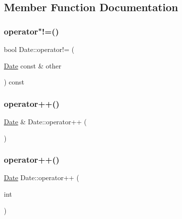 \subsection{Member Function Documentation}
\mbox{\label{classDate_a8b7030515e10d7d79f187165463a3315}} 
\subsubsection{\texorpdfstring{operator"!=()}{operator!=()}}
{\footnotesize\ttfamily bool Date\+::operator!= (\begin{DoxyParamCaption}\item[{\hyperlink{classDate}{Date} const \&}]{other }\end{DoxyParamCaption}) const}

\mbox{\label{classDate_a3993e645e3408e07d12b70e58f36630c}} 
\subsubsection{\texorpdfstring{operator++()}{operator++()}\hspace{0.1cm}{\footnotesize\ttfamily [1/2]}}
{\footnotesize\ttfamily \hyperlink{classDate}{Date} \& Date\+::operator++ (\begin{DoxyParamCaption}{ }\end{DoxyParamCaption})}

\mbox{\label{classDate_a63f7060a7a7997e289e5e885f84557e5}} 
\subsubsection{\texorpdfstring{operator++()}{operator++()}\hspace{0.1cm}{\footnotesize\ttfamily [2/2]}}
{\footnotesize\ttfamily \hyperlink{classDate}{Date} Date\+::operator++ (\begin{DoxyParamCaption}\item[{int}]{ }\end{DoxyParamCaption})}

\mbox{\label{classDate_a074316aeb377c6c1ea828b2642b39153}} 
